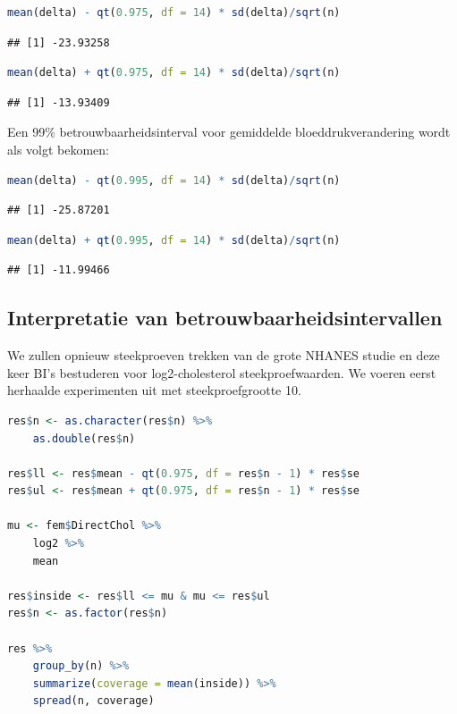 \documentclass[
  12pt,dutch,coursenotes]{book}
\begin{document}
\begin{lstlisting}[language=R]
mean(delta) - qt(0.975, df = 14) * sd(delta)/sqrt(n)
\end{lstlisting}

\begin{lstlisting}
## [1] -23.93258
\end{lstlisting}

\begin{lstlisting}[language=R]
mean(delta) + qt(0.975, df = 14) * sd(delta)/sqrt(n)
\end{lstlisting}

\begin{lstlisting}
## [1] -13.93409
\end{lstlisting}

Een 99\% betrouwbaarheidsinterval voor gemiddelde bloeddrukverandering wordt als volgt bekomen:

\begin{lstlisting}[language=R]
mean(delta) - qt(0.995, df = 14) * sd(delta)/sqrt(n)
\end{lstlisting}

\begin{lstlisting}
## [1] -25.87201
\end{lstlisting}

\begin{lstlisting}[language=R]
mean(delta) + qt(0.995, df = 14) * sd(delta)/sqrt(n)
\end{lstlisting}

\begin{lstlisting}
## [1] -11.99466
\end{lstlisting}

\hypertarget{subsec:interpretBI}{%
\subsection{Interpretatie van betrouwbaarheidsintervallen}\label{subsec:interpretBI}}

We zullen opnieuw steekproeven trekken van de grote NHANES studie en deze keer BI's bestuderen voor log2-cholesterol steekproefwaarden. We voeren eerst herhaalde experimenten uit met steekproefgrootte 10.

\begin{lstlisting}[language=R]
res$n <- as.character(res$n) %>%
    as.double(res$n)

res$ll <- res$mean - qt(0.975, df = res$n - 1) * res$se
res$ul <- res$mean + qt(0.975, df = res$n - 1) * res$se

mu <- fem$DirectChol %>%
    log2 %>%
    mean

res$inside <- res$ll <= mu & mu <= res$ul
res$n <- as.factor(res$n)

res %>%
    group_by(n) %>%
    summarize(coverage = mean(inside)) %>%
    spread(n, coverage)
\end{lstlisting}
\end{document}
